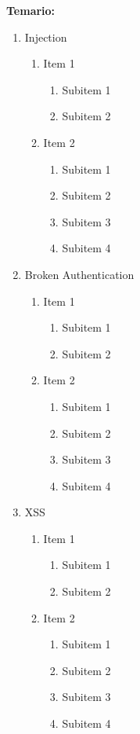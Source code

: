 \documentclass[12pt, letter-paper]{article}
\begin{document}
\noindent\textbf{Temario:}
\begin{enumerate}

\item Injection
  \begin{enumerate}
  \item Item 1
    \begin{enumerate}
    \item Subitem 1
    \item Subitem 2
    \end{enumerate}
  \item Item 2
    \begin{enumerate}
    \item Subitem 1
    \item Subitem 2
    \item Subitem 3
    \item Subitem 4
    \end{enumerate}
  \end{enumerate}

\item Broken Authentication
  \begin{enumerate}
  \item Item 1
    \begin{enumerate}
    \item Subitem 1
    \item Subitem 2
    \end{enumerate}
  \item Item 2
    \begin{enumerate}
    \item Subitem 1
    \item Subitem 2
    \item Subitem 3
    \item Subitem 4
    \end{enumerate}
  \end{enumerate}

\item XSS
  \begin{enumerate}
  \item Item 1
    \begin{enumerate}
    \item Subitem 1
    \item Subitem 2
    \end{enumerate}
  \item Item 2
    \begin{enumerate}
    \item Subitem 1
    \item Subitem 2
    \item Subitem 3
    \item Subitem 4
    \end{enumerate}
  \end{enumerate}


\end{enumerate}
\end{document}
